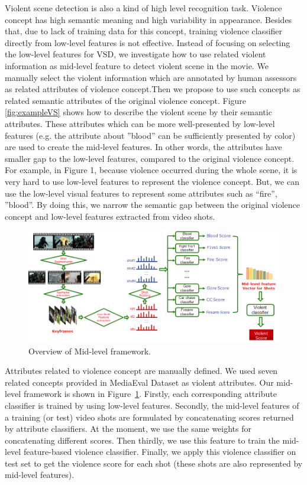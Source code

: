 \documentclass[twocolumn]{bmcart}%
\begin{document}
Violent scene detection is also a kind of high level recognition task. Violence concept has high semantic meaning and high
variability in appearance. Besides that, due to lack of training data for this concept, training violence classifier directly
from low-level features is not effective. Instead of focusing on selecting the low-level features for VSD, we investigate how to use related violent information as mid-level feature to detect violent scene in the movie. We manually select the violent information which are annotated by human assessors as related attributes of violence concept.Then we propose to use such concepts as related semantic attributes of the original violence concept. Figure \ref{fig:exampleVS} shows how to describe the violent scene by their semantic attributes. These attributes which can be more well-presented by low-level features (e.g. the attribute about ”blood” can be sufficiently presented by color) are used to create the mid-level features. In other words, the attributes have smaller gap to the low-level features, compared to the original violence concept. For example, in Figure 1, because violence occurred during the whole scene, it is very hard to use low-level features to represent the violence concept. But, we can use the low-level visual features to represent some attributes such as “fire”, ”blood”. By doing this, we narrow the semantic gap between the original violence concept and low-level features extracted from video shots.
\begin{figure}[!t]
	\centering
	\includegraphics[width=2\linewidth]{Images/Mid-level.png}
	\caption{Overview of Mid-level framework.}
	\label{fig:mid-level}
\end{figure}
Attributes related to violence concept are manually defined. We used seven related concepts provided in MediaEval Dataset as violent attributes. Our mid-level framework is shown in Figure~\ref{fig:mid-level}. Firstly, each corresponding attribute classifier is trained by using low-level features. Secondly, the mid-level features of a training (or test) video shots are formulated by concatenating scores returned by attribute classifiers. At the moment, we use the same weights for concatenating different scores. Then thirdly, we use this feature to train the mid-level feature-based violence classifier. Finally, we apply this violence classifier on test set to get the violence score for each shot (these shots are also represented by mid-level features).
\end{document}
